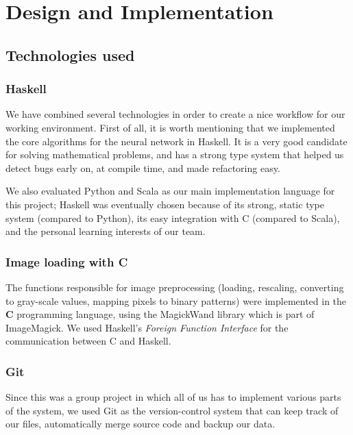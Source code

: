 \chapter{Design and Implementation}

\section{Technologies used}

\subsection*{Haskell}
We have combined several technologies in order to create a nice workflow for our working environment. First of all, it is worth mentioning that we implemented the core algorithms for the neural network in Haskell. It is a very good candidate for solving mathematical problems, and has a strong type system that helped us detect bugs early on, at compile time, and made refactoring easy.

We also evaluated Python and Scala as our main implementation language for this project; Haskell was eventually chosen because of its strong, static type system (compared to Python), its easy integration with C (compared to Scala), and the personal learning interests of our team.

\subsection*{Image loading with C}
The functions responsible for image preprocessing (loading, rescaling, converting to gray-scale values, mapping pixels to binary patterns) were implemented in the \textbf{C} programming language, using the MagickWand library which is part of ImageMagick. We used Haskell's \textit{Foreign Function Interface} for the communication between C and Haskell.

\subsection*{Git}
Since this was a group project in which all of us has to implement various parts of the system, we used Git as the version-control system that can keep track of our files, automatically merge source code and backup our data.


